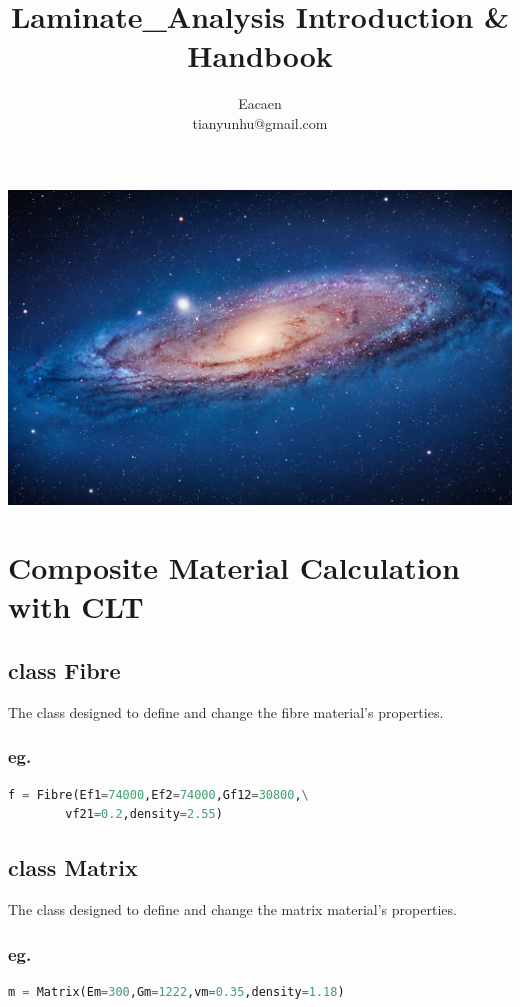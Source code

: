 \documentclass{article}
\begin{document}
\title{ Laminate\_Analysis  Introduction \& Handbook }
\author{Eacaen \\ tianyunhu@gmail.com }
\maketitle
\includegraphics[width = .9\textwidth]{space.jpg}
\newpage
\tableofcontents                        
\newpage
\section{Composite Material Calculation with CLT}
	\subsection{class Fibre}
		The class designed to define and change the fibre material's properties. 
		\subsubsection{eg.}
		\begin{lstlisting}[language={Python}] 
	f = Fibre(Ef1=74000,Ef2=74000,Gf12=30800,\
		vf21=0.2,density=2.55)
		\end{lstlisting}

	\subsection{class Matrix}
		The class designed to define and change the matrix material's properties. 

		\subsubsection{eg.}	
		\begin{lstlisting}[language={Python}] 
	m = Matrix(Em=300,Gm=1222,vm=0.35,density=1.18)
		\end{lstlisting}
\end{document}
